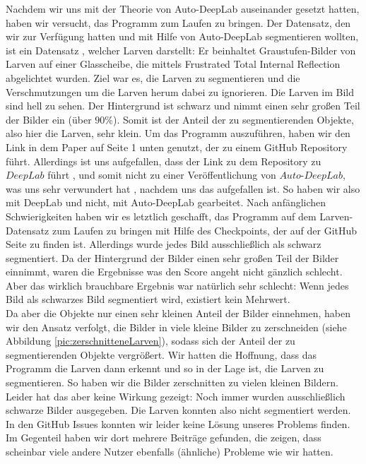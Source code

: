 Nachdem wir uns mit der Theorie von Auto-DeepLab auseinander gesetzt hatten, haben wir versucht, das Programm zum Laufen zu bringen. Der Datensatz, den wir zur Verfügung hatten und mit Hilfe von Auto-DeepLab segmentieren wollten, ist ein Datensatz \cite{larven}, welcher Larven  darstellt: Er beinhaltet Graustufen-Bilder von Larven auf einer Glasscheibe, die mittels Frustrated Total Internal Reflection abgelichtet wurden. Ziel war es, die Larven zu segmentieren und die Verschmutzungen um die Larven herum dabei zu ignorieren. Die Larven im Bild sind hell zu sehen. Der Hintergrund ist schwarz und nimmt einen sehr großen Teil der Bilder ein (über $90\%$). Somit ist der Anteil der zu segmentierenden Objekte, also hier die Larven, sehr klein. Um das Programm auszuführen, haben wir den Link in dem Paper \cite{autodeeplabPaper} auf Seite 1 unten genutzt, der zu einem GitHub Repository führt. Allerdings ist uns aufgefallen, dass der Link zu dem Repository zu $\textit{DeepLab}$ führt \cite{deeplabGithub}, und somit nicht zu einer Veröffentlichung von $\textit{Auto-DeepLab}$, was uns sehr verwundert hat  , nachdem uns das aufgefallen ist. So haben wir also mit DeepLab und nicht, mit Auto-DeepLab gearbeitet. Nach anfänglichen Schwierigkeiten haben wir es letztlich geschafft, das Programm auf dem Larven-Datensatz zum Laufen zu bringen mit Hilfe des Checkpoints, der auf der GitHub Seite zu finden ist. Allerdings wurde jedes Bild ausschließlich als schwarz segmentiert. Da der Hintergrund der Bilder einen sehr großen Teil der Bilder einnimmt, waren die Ergebnisse was den Score angeht nicht gänzlich schlecht. Aber das wirklich brauchbare Ergebnis war natürlich sehr schlecht: Wenn jedes Bild als schwarzes Bild segmentiert wird, existiert kein Mehrwert.\\
Da aber die Objekte nur einen sehr kleinen Anteil der Bilder einnehmen, haben wir den Ansatz verfolgt, die Bilder in viele kleine Bilder zu zerschneiden (siehe Abbildung \ref{pic:zerschnitteneLarven}), sodass sich der Anteil der zu segmentierenden Objekte vergrößert. Wir hatten die Hoffnung, dass das Programm die Larven dann erkennt und so in der Lage ist, die Larven zu segmentieren. So haben wir die Bilder zerschnitten zu vielen kleinen Bildern.\\
Leider hat das aber keine Wirkung gezeigt: Noch immer wurden ausschließlich schwarze Bilder ausgegeben. Die Larven konnten also nicht segmentiert werden.\\
In den GitHub Issues konnten wir leider keine Lösung unseres Problems finden. Im Gegenteil haben wir dort mehrere Beiträge gefunden, die zeigen, dass scheinbar viele andere Nutzer ebenfalls (ähnliche) Probleme wie wir hatten.\\


